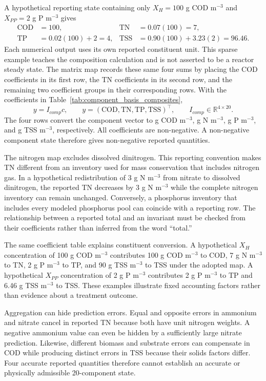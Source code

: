 A hypothetical reporting state containing only $X_H=100$ g COD m$^{-3}$ and $X_{PP}=2$ g P m$^{-3}$ gives
\[
\begin{aligned}
\mathrm{COD}&=100, &\mathrm{TN}&=0.07(100)=7,\\
\mathrm{TP}&=0.02(100)+2=4,
&\mathrm{TSS}&=0.90(100)+3.23(2)=96.46.
\end{aligned}
\]
Each numerical output uses its own reported constituent unit. This sparse example teaches the composition calculation and is not asserted to be a reactor steady state. The matrix map records these same four sums by placing the COD coefficients in its first row, the TN coefficients in its second row, and the remaining two coefficient groups in their corresponding rows. With the coefficients in Table~\ref{tab:component_basis_composites},
\begin{equation}
y=I_{comp}c,\qquad
y=(\mathrm{COD},\mathrm{TN},\mathrm{TP},\mathrm{TSS})^\top,\qquad
I_{comp}\in\mathbb{R}^{4\times20}.
\label{eq:component_composite_map}
\end{equation}
The four rows convert the component vector to g COD m$^{-3}$, g N m$^{-3}$, g P m$^{-3}$, and g TSS m$^{-3}$, respectively. All coefficients are non-negative. A non-negative component state therefore gives non-negative reported quantities.

The nitrogen map excludes dissolved dinitrogen. This reporting convention makes TN different from an inventory used for mass conservation that includes nitrogen gas. In a hypothetical redistribution of 3 g N m$^{-3}$ from nitrate to dissolved dinitrogen, the reported TN decreases by 3 g N m$^{-3}$ while the complete nitrogen inventory can remain unchanged. Conversely, a phosphorus inventory that includes every modeled phosphorus pool can coincide with a reporting row. The relationship between a reported total and an invariant must be checked from their coefficients rather than inferred from the word ``total.''

The same coefficient table explains constituent conversion. A hypothetical $X_H$ concentration of 100 g COD m$^{-3}$ contributes 100 g COD m$^{-3}$ to COD, 7 g N m$^{-3}$ to TN, 2 g P m$^{-3}$ to TP, and 90 g TSS m$^{-3}$ to TSS under the adopted map. A hypothetical $X_{PP}$ concentration of 2 g P m$^{-3}$ contributes 2 g P m$^{-3}$ to TP and 6.46 g TSS m$^{-3}$ to TSS. These examples illustrate fixed accounting factors rather than evidence about a treatment outcome.

Aggregation can hide prediction errors. Equal and opposite errors in ammonium and nitrate cancel in reported TN because both have unit nitrogen weights. A negative ammonium value can even be hidden by a sufficiently large nitrate prediction. Likewise, different biomass and substrate errors can compensate in COD while producing distinct errors in TSS because their solids factors differ. Four accurate reported quantities therefore cannot establish an accurate or physically admissible 20-component state.

